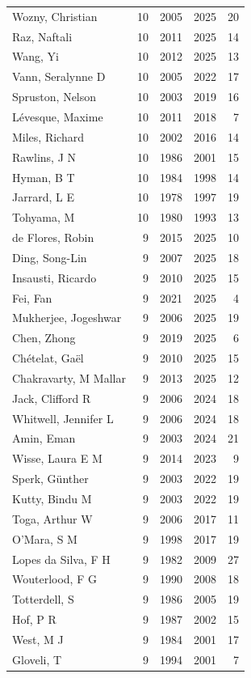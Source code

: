 \documentclass{../latex/analysis_report}
\begin{document}
\begin{longtable}{lrrrr}
Wozny, Christian & 10 & 2005 & 2025 & 20 \\
Raz, Naftali & 10 & 2011 & 2025 & 14 \\
Wang, Yi & 10 & 2012 & 2025 & 13 \\
Vann, Seralynne D & 10 & 2005 & 2022 & 17 \\
Spruston, Nelson & 10 & 2003 & 2019 & 16 \\
Lévesque, Maxime & 10 & 2011 & 2018 & 7 \\
Miles, Richard & 10 & 2002 & 2016 & 14 \\
Rawlins, J N & 10 & 1986 & 2001 & 15 \\
Hyman, B T & 10 & 1984 & 1998 & 14 \\
Jarrard, L E & 10 & 1978 & 1997 & 19 \\
Tohyama, M & 10 & 1980 & 1993 & 13 \\
de Flores, Robin & 9 & 2015 & 2025 & 10 \\
Ding, Song-Lin & 9 & 2007 & 2025 & 18 \\
Insausti, Ricardo & 9 & 2010 & 2025 & 15 \\
Fei, Fan & 9 & 2021 & 2025 & 4 \\
Mukherjee, Jogeshwar & 9 & 2006 & 2025 & 19 \\
Chen, Zhong & 9 & 2019 & 2025 & 6 \\
Chételat, Gaël & 9 & 2010 & 2025 & 15 \\
Chakravarty, M Mallar & 9 & 2013 & 2025 & 12 \\
Jack, Clifford R & 9 & 2006 & 2024 & 18 \\
Whitwell, Jennifer L & 9 & 2006 & 2024 & 18 \\
Amin, Eman & 9 & 2003 & 2024 & 21 \\
Wisse, Laura E M & 9 & 2014 & 2023 & 9 \\
Sperk, Günther & 9 & 2003 & 2022 & 19 \\
Kutty, Bindu M & 9 & 2003 & 2022 & 19 \\
Toga, Arthur W & 9 & 2006 & 2017 & 11 \\
O'Mara, S M & 9 & 1998 & 2017 & 19 \\
Lopes da Silva, F H & 9 & 1982 & 2009 & 27 \\
Wouterlood, F G & 9 & 1990 & 2008 & 18 \\
Totterdell, S & 9 & 1986 & 2005 & 19 \\
Hof, P R & 9 & 1987 & 2002 & 15 \\
West, M J & 9 & 1984 & 2001 & 17 \\
Gloveli, T & 9 & 1994 & 2001 & 7 \\

\end{longtable}
\end{document}

